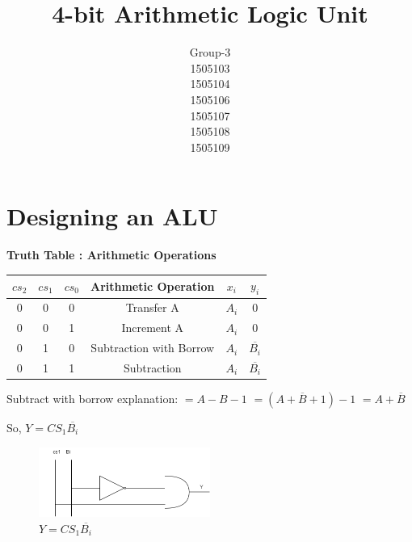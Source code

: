 \documentclass[]{article}
\title{4-bit Arithmetic Logic Unit}
\author{Group-3\\1505103\\1505104\\1505106\\1505107\\1505108\\1505109}
\begin{document}
	
	\maketitle
	
	\newpage
	\section{Designing an ALU}
	
	\textbf{Truth Table : Arithmetic Operations}
	\begin{center}
		\begin{tabular}{ |c|c|c|c|c|c| } 
			\hline
			$cs_2$ & $cs_1$ & $cs_0$ & Arithmetic Operation & $x_i$ & $y_i$  \\
			\hline
			
			\hline
			0 & 0 & 0 & Transfer A & $A_i$ & 0 \\
			\hline

			\hline
			0 & 0 & 1 & Increment A & $A_i$ & 0 \\
			\hline
			
			\hline
			0 & 1 & 0 & Subtraction with Borrow & $A_i$ & $\overline{B_i}$ \\
			\hline
			
			\hline
			0 & 1 & 1 & Subtraction & $A_i$ & $\overline{B_i}$ \\
			\hline
		\end{tabular}
	\end{center}
	
	
	
	Subtract with borrow explanation:\newline
	$=A-B-1$ \newline
	$=(A+\overline{B}+1)-1$ \newline
	$=A+\overline{B}$ \newline
	
	So, $Y=CS_1\overline{B_i}$
	\begin{figure}[h]
		\centering
		\includegraphics[width = 0.5\textwidth]{image/ckt1.png}
		\caption{
		$Y=CS_1\overline{B_i}$
		}
		\label{fig:ckt1}
		
	\end{figure}
	
\end{document}
